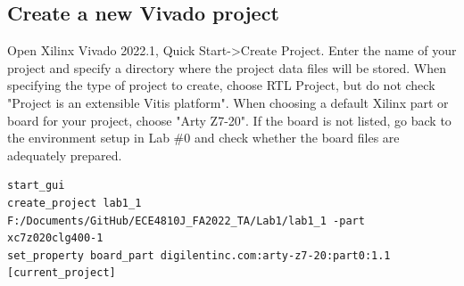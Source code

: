 \documentclass[a4paper,12pt,twoside]{article}
\begin{document}
\subsection{Create a new Vivado project}
Open Xilinx Vivado 2022.1, Quick Start->Create Project. Enter the name of your project and specify a directory where the project data files will be stored. When specifying the type of project to create, choose RTL Project, but do not check "Project is an extensible Vitis platform". When choosing a default Xilinx part or board for your project, choose "Arty Z7-20". If the board is not listed, go back to the environment setup in Lab \#0 and check whether the board files are adequately prepared.
\begin{verbatim}
start_gui
create_project lab1_1 F:/Documents/GitHub/ECE4810J_FA2022_TA/Lab1/lab1_1 -part xc7z020clg400-1
set_property board_part digilentinc.com:arty-z7-20:part0:1.1 [current_project]
\end{verbatim}
\end{document}

